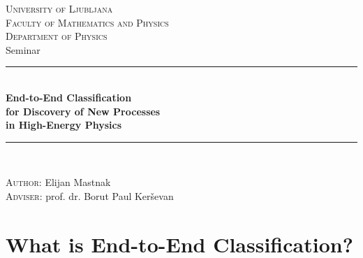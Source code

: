 \documentclass[14pt, t]{beamer}
\begin{document}
\begin{frame}[plain]
    \begin{center}

    \small{\textsc{University of Ljubljana}}\\
    \small{\textsc{Faculty of {\color{ul-red} Mathematics and Physics}}}\\[1mm]
    \footnotesize{\textsc{Department of Physics}}\\
    \vspace{2mm}
    \large{Seminar}\\
    \vspace{-2mm}
    \rule{\textwidth}{0.2pt}\\[3mm]

    {\Large \textbf{End-to-End Classification}} \\[-1mm]
    {\small \textbf{for Discovery of New Processes}}\\[-2mm]
    {\small \textbf{in High-Energy Physics}}

    \vspace{-1mm}
    \rule{\textwidth}{0.2pt}\\[3mm]

    \vspace{5mm}

    \scriptsize{\textsc{Author:} Elijan Mastnak}\\
    \scriptsize{\textsc{Adviser:} prof. dr. Borut Paul Ker\v{s}evan}\\

    \end{center}
    
\end{frame}


\section{What is End-to-End Classification?}
\end{document}
